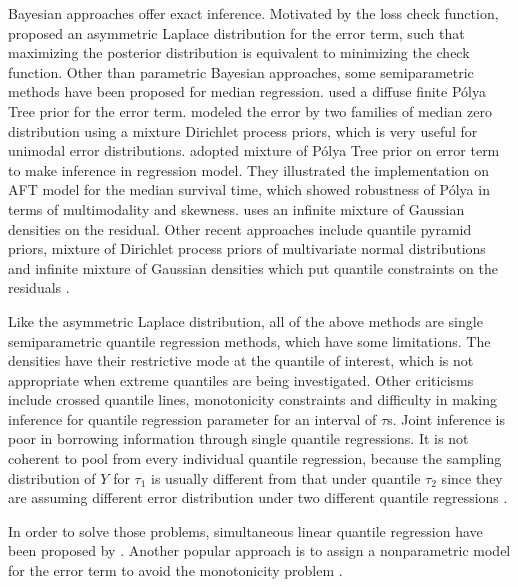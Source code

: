 \documentclass[12pt]{article}
\newcommand{\polya}{P\'{o}lya}
\begin{document}
Bayesian approaches offer exact inference. Motivated by the loss check
function, \citet{yu2001} proposed an asymmetric Laplace distribution
for the error term, such that maximizing the posterior distribution is
equivalent to minimizing the check function. Other than parametric
Bayesian approaches, some semiparametric methods have been proposed
for median regression. \citet{walker1999} used a diffuse finite
\polya{} Tree prior for the error term. \citet{kottas2001} modeled the
error by two families of median zero distribution using a mixture
Dirichlet process priors, which is very useful for unimodal error
distributions. \citet{hanson2002} adopted mixture of \polya{} Tree
prior on error term to make inference in regression model. They
illustrated the implementation on AFT model for the median survival
time, which showed robustness of \polya{} in terms of multimodality
and skewness.  \citet{reich2010} uses an infinite mixture of Gaussian
densities on the residual.  Other recent approaches include quantile
pyramid priors, mixture of Dirichlet process priors of multivariate
normal distributions and infinite mixture of Gaussian densities which
put quantile constraints on the residuals \citep{hjort2007,hjort2009,
  kottas2009}.

Like the asymmetric Laplace distribution, all of the above methods are
single semiparametric quantile regression methods, which have some
limitations. The densities have their restrictive mode at the quantile
of interest, which is not appropriate when extreme quantiles are being
investigated. Other criticisms include crossed quantile lines,
monotonicity constraints and difficulty in making inference for
quantile regression parameter for an interval of $\tau$s. Joint
inference is poor in borrowing information through single quantile
regressions. It is not coherent to pool from every individual quantile
regression, because the sampling distribution of $Y$ for $\tau_1$ is
usually different from that under quantile $\tau_2$ since they are
assuming different error distribution under two different quantile
regressions \citep{tokdar2011}.

In order to solve those problems, simultaneous linear quantile
regression have been proposed by \citet{tokdar2011}.  Another popular
approach is to assign a nonparametric model for the error term to
avoid the monotonicity problem \citep{scaccia2003, geweke2007,
  taddy2010}.
\end{document}
